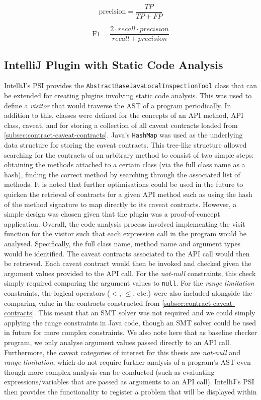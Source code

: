 \begin{equation}
\label{precision}
\text{precision}=\frac{TP}{TP + FP}
\end{equation}

\begin{equation}
\label{f-measure}
\text{F1}=\frac{2\cdot recall\cdot precision}{recall + precision}
\end{equation}

\subsection{IntelliJ Plugin with Static Code Analysis}
\label{subsec:contract-plugin}
IntelliJ's PSI provides the \lstinline{AbstractBaseJavaLocalInspectionTool} class that can be extended for creating plugins involving static code analysis. This was used to define a \textit{visitor} that would traverse the AST of a program periodically. In addition to this, classes were defined for the concepts of an API method, API class, caveat, and for storing a collection of all caveat contracts loaded from \ref{subsec:contract-caveat-contracts}. Java's \lstinline{HashMap} was used as the underlying data structure for storing the caveat contracts. This tree-like structure allowed searching for the contracts of an arbitrary method to consist of two simple steps: obtaining the methods attached to a certain class (via the full class name as a hash), finding the correct method by searching through the associated list of methods. It is noted that further optimisations could be used in the future to quicken the retrieval of contracts for a given API method such as using the hash of the method signature to map directly to its caveat contracts. However, a simple design was chosen given that the plugin was a proof-of-concept application. Overall, the code analysis process involved implementing the visit function for the visitor such that each expression call in the program would be analysed. Specifically, the full class name, method name and argument types would be identified. The caveat contracts associated to the API call would then be retrieved. Each caveat contract would then be invoked and checked given the argument values provided to the API call. For the \textit{not-null} constraints, this check simply required comparing the argument values to \lstinline{null}. For the \textit{range limitation} constraints, the logical operators ($<$, $\leq$, etc.) were also included alongside the comparing value in the contracts constructed from \ref{subsec:contract-caveat-contracts}. This meant that an SMT solver was not required and we could simply applying the range constraints in Java code, though an SMT solver could be used in future for more complex constraints. We also note here that as baseline checker program, we only analyse argument values passed directly to an API call. Furthermore, the caveat categories of interest for this thesis are \textit{not-null} and \textit{range limitation}, which do not require further analysis of a program's AST even though more complex analysis can be conducted (such as evaluating expressions/variables that are passed as arguments to an API call). IntelliJ's PSI then provides the functionality to register a problem that will be displayed within 